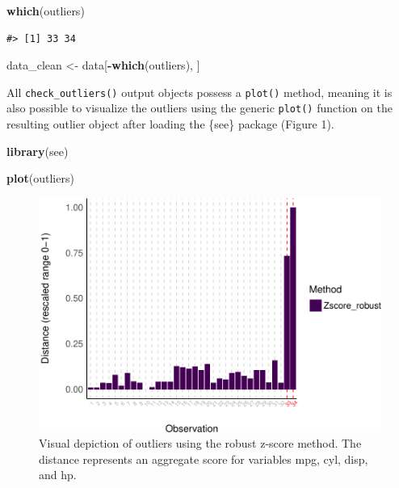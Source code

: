 \documentclass[sn-basic, lineno,pdflatex]{sn-jnl}
\newenvironment{Shaded}{\begin{snugshade}}{\end{snugshade}}
\newcommand{\FunctionTok}[1]{\textcolor[rgb]{0.13,0.29,0.53}{\textbf{#1}}}
\newcommand{\NormalTok}[1]{#1}
\newcommand{\OtherTok}[1]{\textcolor[rgb]{0.56,0.35,0.01}{#1}}
\newcommand{\SpecialCharTok}[1]{\textcolor[rgb]{0.81,0.36,0.00}{\textbf{#1}}}
\begin{document}
\begin{Shaded}
\begin{Highlighting}[]
\FunctionTok{which}\NormalTok{(outliers)}
\end{Highlighting}
\end{Shaded}

\begin{verbatim}
#> [1] 33 34
\end{verbatim}

\begin{Shaded}
\begin{Highlighting}[]
\NormalTok{data\_clean }\OtherTok{\textless{}{-}}\NormalTok{ data[}\SpecialCharTok{{-}}\FunctionTok{which}\NormalTok{(outliers), ]}
\end{Highlighting}
\end{Shaded}

All \texttt{check\_outliers()} output objects possess a \texttt{plot()}
method, meaning it is also possible to visualize the outliers using the
generic \texttt{plot()} function on the resulting outlier object after
loading the \{see\} package (Figure 1).

\begin{Shaded}
\begin{Highlighting}[]
\FunctionTok{library}\NormalTok{(see)}

\FunctionTok{plot}\NormalTok{(outliers)}
\end{Highlighting}
\end{Shaded}

\begin{figure}
\includegraphics[width=1\linewidth]{paper_files/figure-latex/univariate_implicit-1} \caption{Visual depiction of outliers using the robust z-score method. The distance represents an aggregate score for variables mpg, cyl, disp, and hp.}\label{fig:univariate_implicit}
\end{figure}
\end{document}
